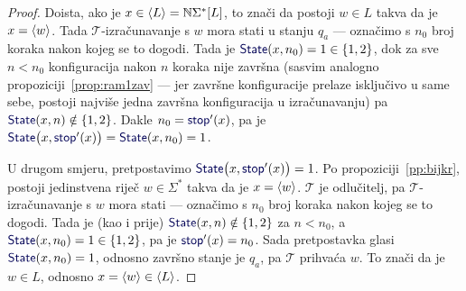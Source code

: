 \begin{proof}
Doista, ako je $x\in\langle L\rangle={\mathbb N}\Sigma^*[L]$, to znači da postoji $w\in L$ takva da je $x=\langle w\rangle$. Tada $\mathcal T$\!-izračunavanje s $w$ mora stati u stanju $q_a$ --- označimo s $n_0$ broj koraka nakon kojeg se to dogodi. Tada je $\f{State}(x,n_0)=1\in\{1,2\}$, dok za sve $n<n_0$ konfiguracija nakon $n$ koraka nije završna (sasvim analogno propoziciji~\ref{prop:ram1zav} --- jer završne konfiguracije prelaze isključivo u same sebe, postoji najviše jedna završna konfiguracija u izračunavanju) pa $\f{State}(x,n)\notin\{1,2\}$. Dakle $n_0=\f{stop}'(x)$, pa je $\f{State}\bigl(x,\f{stop}'(x)\bigr)=\f{State}(x,n_0)=1$.

U drugom smjeru, pretpostavimo $\f{State}\bigl(x,\f{stop}'(x)\bigr)=1$. Po propoziciji~\ref{pp:bijkr}, postoji jedinstvena riječ $w\in\Sigma^*$ takva da je $x=\langle w\rangle$. $\mathcal T$ je odlučitelj, pa $\mathcal T$\!-izračunavanje s $w$ mora stati --- označimo s $n_0$ broj koraka nakon kojeg se to dogodi. Tada je (kao i prije) $\f{State}(x,n)\notin\{1,2\}$ za $n<n_0$, a $\f{State}(x,n_0)=1\in\{1,2\}$, pa je $\f{stop}'(x)=n_0$. Sada pretpostavka glasi $\f{State}(x,n_0)=1$, odnosno završno stanje je $q_a$, pa $\mathcal T$ prihvaća $w$. To znači da je $w\in L$, odnosno $x=\langle w\rangle\in\langle L\rangle$.
\end{proof}

